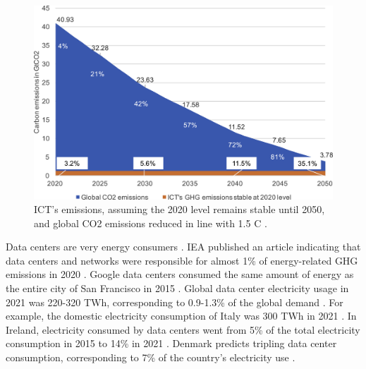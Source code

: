 \begin{figure}[!htb]
    \centering
    \includegraphics[scale=0.8]{Images/Related_works/gr6_lrg.jpg}
    \caption[ICT's emissions, assuming the 2020 level remains stable until 2050, and global CO2 emissions reduced in line with 1.5 \degree C.]{ICT's emissions, assuming the 2020 level remains stable until 2050, and global CO2 emissions reduced in line with 1.5 \degree C \cite{freitag2021climate}.}
    \label{fig:stable_emissions_ICT}
\end{figure}


Data centers are very energy consumers \cite{llopis2014survey}. IEA published an article indicating that data centers and networks were responsible for almost 1\% of energy-related GHG emissions in 2020 \cite{centres2022data}. Google data centers consumed the same amount of energy as the entire city of San Francisco in 2015 \cite{khan2018exploiting}. Global data center electricity usage in 2021 was 220-320 TWh, corresponding to 0.9-1.3\% of the global demand \cite{centres2022data}. For example, the domestic electricity consumption of Italy was 300 TWh in 2021 \cite{ElectricityDomesticConsumption}. In Ireland, electricity consumed by data centers went from 5\% of the total electricity consumption in 2015 to 14\% in 2021 \cite{IrelandDatacenter}. Denmark predicts tripling data center consumption, corresponding to 7\% of the country’s electricity use \cite{DenmarkDatacenter}.


